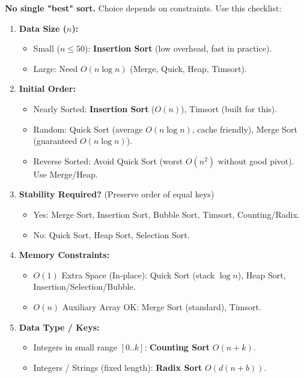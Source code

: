 \documentclass[11pt]{article}
\begin{document}
\begin{methode}
    \textbf{No single "best" sort.} Choice depends on constraints. Use this checklist:
    \begin{enumerate}
        \item \textbf{Data Size ($n$):}
            \begin{itemize}
                \item Small ($n \le 50$): \textbf{Insertion Sort} (low overhead, fast in practice).
                \item Large: Need $O(n \log n)$ (Merge, Quick, Heap, Timsort).
            \end{itemize}
        \item \textbf{Initial Order:}
            \begin{itemize}
                \item Nearly Sorted: \textbf{Insertion Sort} ($O(n)$), Timsort (built for this).
                \item Random: Quick Sort (average $O(n \log n)$, cache friendly), Merge Sort (guaranteed $O(n \log n)$).
                \item Reverse Sorted: Avoid Quick Sort (worst $O(n^2)$ without good pivot). Use Merge/Heap.
            \end{itemize}
        \item \textbf{Stability Required?} (Preserve order of equal keys)
            \begin{itemize}
                \item Yes: Merge Sort, Insertion Sort, Bubble Sort, Timsort, Counting/Radix.
                \item No: Quick Sort, Heap Sort, Selection Sort.
            \end{itemize}
        \item \textbf{Memory Constraints:}
            \begin{itemize}
                \item $O(1)$ Extra Space (In-place): Quick Sort (stack $\log n$), Heap Sort, Insertion/Selection/Bubble.
                \item $O(n)$ Auxiliary Array OK: Merge Sort (standard), Timsort.
            \end{itemize}
        \item \textbf{Data Type / Keys:}
            \begin{itemize}
                \item Integers in small range $[0..k]$: \textbf{Counting Sort} $O(n+k)$.
                \item Integers / Strings (fixed length): \textbf{Radix Sort} $O(d(n+b))$.
            \end{itemize}
    \end{enumerate}
\end{methode}
\end{document}
